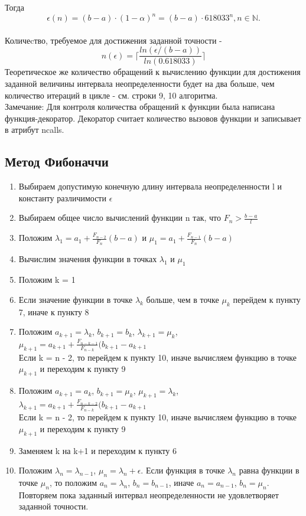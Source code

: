 \documentclass[main.tex]{subfiles}
\begin{document}
	Тогда $$\epsilon(n) = (b - a)\cdot(1 - \alpha)^n = (b - a)\cdot 618033^n, n \in \mathbb{N}.$$\\
	Количеcтво, требуемое для достижения заданной точности - $$n(\epsilon) = \bigg\lceil\frac{ln(\epsilon/(b-a))}{ln(0.618033)}\bigg\rceil$$
	Теоретическое же количество обращений к вычислению функции для достижения заданной величины интервала неопределенности будет на два больше, чем количество итераций в цикле - см. строки 9, 10 алгоритма.\\
	Замечание: Для контроля количества обращений к функции была написана функция-декоратор. Декоратор считает количество вызовов функции и записывает в атрибут ncalls.
	 
	
	
	
	\subsection{Метод Фибоначчи}
	\begin{enumerate}
		\item Выбираем допустимую конечную длину интервала неопределенности l и константу различимости $\epsilon$ 
		\item Выбираем общее число вычислений функции n так, что $F_n >\frac{b-a}{l}$
		\item Положим $\lambda_1 = a_1+\frac{F_{n-2}}{F_n}(b-a)$ и  $\mu_1 = a_1+\frac{F_{n-1}}{F_n}(b-a)$
		\item Вычислим значения функции в точках $\lambda_1$ и $\mu_1$
		\item Положим k = 1
		\item Если значение функции в точке $\lambda_k$ больше, чем в точке $\mu_k$ перейдем к пункту 7, иначе к пункту 8
		\item Положим $a_{k+1} = \lambda_k$, $b_{k+1} = b_k$, $\lambda_{k+1} = \mu_k$, $\mu_{k+1} = a_{k+1}+\frac{F_{n-k-1}}{F_{n-k}}(b_{k+1}-a_{k+1}$\\
		Если k = n - 2, то перейдем к пункту 10, иначе вычисляем функцию в точке $\mu_{k+1}$ и переходим к пункту 9
		\item Положим $a_{k+1} = a_k$, $b_{k+1} = \mu_k$, $\mu_{k+1} = \lambda_k$, $\lambda_{k+1} = a_{k+1}+\frac{F_{n-k-2}}{F_{n-k}}(b_{k+1}-a_{k+1}$\\
		Если k = n - 2, то перейдем к пункту 10, иначе вычисляем функцию в точке $\mu_{k+1}$ и переходим к пункту 9
		\item Заменяем k на k+1 и переходим к пункту 6
		\item Положим $\lambda_{n} = \lambda_{n-1}$, $\mu_{n} = \lambda_n + \epsilon$. Если функция в точке $\lambda_n$ равна функции в точке $\mu_n$, то положим $a_n = \lambda_n$, $b_n=b_{n-1}$, иначе $a_n = a_{n-1}$, $b_n=\mu_n$. Повторяем пока заданный интервал неопределенности не удовлетворяет заданной точности.
	\end{enumerate}
	
\end{document}
